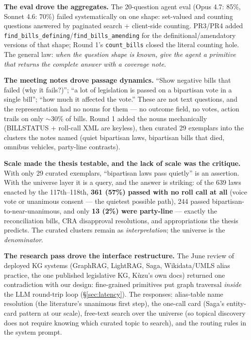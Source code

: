 \documentclass[11pt]{article}
\newcommand{\code}[1]{\texttt{#1}}
\begin{document}
\textbf{The eval drove the aggregates.} The 20-question agent eval (Opus 4.7:
85\%, Sonnet 4.6: 70\%) failed systematically on one shape: set-valued and
counting questions answered by paginated search + client-side counting.
PR3/PR4 added \code{find\_bills\_defining}/\code{find\_bills\_amending} for
the definitional/amendatory versions of that shape; Round 1's
\code{count\_bills} closed the literal counting hole. The general law:
\emph{when the question shape is known, give the agent a primitive that
returns the complete answer with a coverage note}.

\textbf{The meeting notes drove passage dynamics.} ``Show negative bills that
failed (why it fails?)''; ``a lot of legislation is passed on a bipartisan
vote in a single bill''; ``how much it affected the vote.'' These are not text
questions, and the representation had no nouns for them --- no outcome field,
no votes, action trails on only $\sim$30\% of bills. Round 1 added the nouns
mechanically (BILLSTATUS + roll-call XML are keyless), then curated 29
exemplars into the clusters the notes named (quiet bipartisan laws, bipartisan
bills that died, omnibus vehicles, party-line contrasts).

\textbf{Scale made the thesis testable, and the lack of scale was the
critique.} With only 29 curated exemplars, ``bipartisan laws pass quietly''
is an assertion. With the universe layer it is a query, and the answer is
striking: of the 639 laws enacted by the 117th--118th, \textbf{361 (57\%)
passed with no roll call at all} (voice vote or unanimous consent --- the
quietest possible path), 244 passed bipartisan-to-near-unanimous, and only
\textbf{13 (2\%) were party-line} --- exactly the reconciliation bills, CRA
disapproval resolutions, and appropriations the thesis predicts. The curated
clusters remain as \emph{interpretation}; the universe is the
\emph{denominator}.

\textbf{The research pass drove the interface restructure.} The June review
of deployed KG systems (GraphRAG, LightRAG, Saga, Wikidata/UMLS alias
practice, the one published legislative KG, K\`uzu's own docs) returned one
contradiction with our design: fine-grained primitives put graph traversal
\emph{inside} the LLM round-trip loop (\S\ref{sec:latency}). The responses:
alias-table name resolution (the literature's unanimous first step),
the one-call card (Saga's entity-card pattern at our scale), free-text
search over the universe (so topical discovery does not require knowing
which curated topic to search), and the routing rules in the system prompt.
\end{document}
